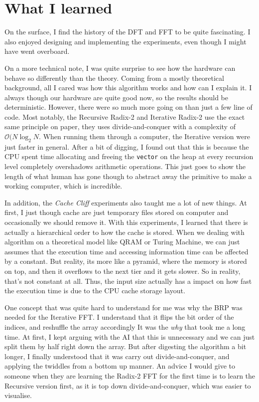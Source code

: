 \documentclass{article}
\begin{document}
\section{What I learned}
On the surface, I find the history of the DFT and FFT to be quite fascinating. I also enjoyed designing and implementing the experiments, even though I might have went overboard. 

On a more technical note, I was quite surprise to see how the hardware can behave so differently than the theory. Coming from a mostly theoretical background, all I cared was how this algorithm works and how can I explain it. I always though our hardware are quite good now, so the results should be deterministic. However, there were so much more going on than just a few line of code. Most notably, the Recursive Radix-2 and Iterative Radix-2 use the exact same principle on paper, they uses divide-and-conquer with a complexity of $\mathcal{O}(N\log_2N$. When running them through a computer, the Iterative version were just faster in general. After a bit of digging, I found out that this is because the CPU spent time allocating and freeing the \texttt{vector} on the heap at every recursion level completely overshadows arithmetic operations. This just goes to show the length of what human has gone though to abstract away the primitive to make a working computer, which is incredible. 

In addition, the \textit{Cache Cliff} experiments also taught me a lot of new things. At first, I just though cache are just temporary files stored on computer and occasionally we should remove it. With this experiments, I learned that there is actually a hierarchical order to how the cache is stored. When we dealing with algorithm on a theoretical model like QRAM or Turing Machine, we can just assumes that the execution time and accessing information time can be affected by a constant. But reality, its more like a pyramid, where the memory is stored on top, and then it overflows to the next tier and it gets slower. So in reality, that's not constant at all. Thus, the input size actually has a impact on how fast the execution time is due to the CPU cache storage layout.

One concept that was quite hard to understand for me was why the BRP was needed for the Iterative FFT. I understand that it flips the bit order of the indices, and reshuffle the array accordingly It was the \emph{why} that took me a long time. At first, I kept arguing with the AI that this is unnecessary and we can just split them by half right down the array. But after digesting the algorithm a bit longer, I finally understood that it was carry out divide-and-conquer, and applying the twiddles from a bottom up manner. An advice I would give to someone when they are learning the Radix-2 FFT for the first time is to learn the Recursive version first, as it is top down divide-and-conquer, which was easier to visualise. 
\end{document}
